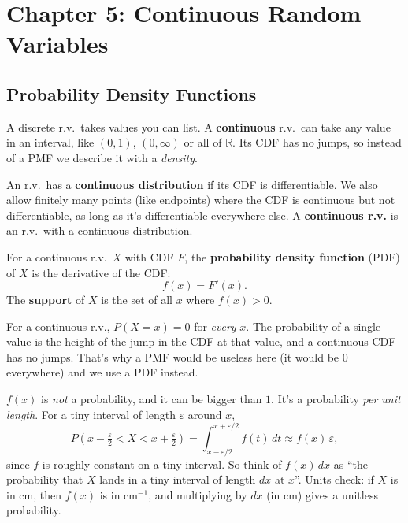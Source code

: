 \section[Continuous Random Variables]{Chapter 5: Continuous Random Variables}

\subsection{Probability Density Functions}

\bigskip

A discrete r.v.\ takes values you can list. A \textbf{continuous} r.v.\ can take any value in an interval, like $(0, 1)$, $(0, \infty)$ or all of $\mathbb{R}$. Its CDF has no jumps, so instead of a PMF we describe it with a \emph{density}.

\bigskip

\begin{definition}[Continuous r.v.]\label{def:contrv}
An r.v.\ has a \textbf{continuous distribution} if its CDF is differentiable. We also allow finitely many points (like endpoints) where the CDF is continuous but not differentiable, as long as it's differentiable everywhere else. A \textbf{continuous r.v.} is an r.v.\ with a continuous distribution.
\end{definition}

\bigskip

\begin{definition}\label{def:pdf}
For a continuous r.v.\ $X$ with CDF $F$, the \textbf{probability density function} (PDF) of $X$ is the derivative of the CDF:
\medskip
\[
f(x) = F'(x).
\]
\medskip
The \textbf{support} of $X$ is the set of all $x$ where $f(x) > 0$.
\end{definition}

\bigskip

\begin{remark}
For a continuous r.v., $P(X = x) = 0$ for \emph{every} $x$. The probability of a single value is the height of the jump in the CDF at that value, and a continuous CDF has no jumps. That's why a PMF would be useless here (it would be $0$ everywhere) and we use a PDF instead.
\end{remark}

\bigskip

\begin{intuition}
$f(x)$ is \emph{not} a probability, and it can be bigger than $1$. It's a probability \emph{per unit length}. For a tiny interval of length $\varepsilon$ around $x$,
\medskip
\[
P\!\left(x - \tfrac{\varepsilon}{2} < X < x + \tfrac{\varepsilon}{2}\right) = \int_{x - \varepsilon/2}^{x + \varepsilon/2} f(t)\,dt \approx f(x)\,\varepsilon,
\]
\medskip
since $f$ is roughly constant on a tiny interval. So think of $f(x)\,dx$ as ``the probability that $X$ lands in a tiny interval of length $dx$ at $x$''. Units check: if $X$ is in cm, then $f(x)$ is in cm$^{-1}$, and multiplying by $dx$ (in cm) gives a unitless probability.
\end{intuition}

